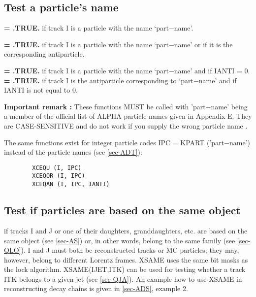 \subsection{\label{sec-TVATPN}Test a particle's name}
\par
\begin{indentlist}{ 5.75cm}{ 6.00cm}
{\bf = .TRUE.} if track I is a particle with the name
`part$-$name'.
 
{\bf = .TRUE.} if track I is a particle with the name
`part$-$name' or if it is the corresponding antiparticle.
 
{\bf = .TRUE.} if track I is a particle with the name
`part$-$name' and if IANTI = 0.
{\bf = .TRUE.} if track I is the antiparticle corresponding to
`part$-$name' and if IANTI is not equal to 0.
\end{indentlist}
 {\bf Important remark :}  These functions MUST  be called
 with 'part$-$name' being a member of the official list of ALPHA particle names given in Appendix E.
  They are CASE-SENSITIVE and do not work if you supply the wrong
 particle name .
\par
The same functions exist for
integer particle codes IPC = KPART ('part$-$name') instead of
the particle names (see \ref{sec-ADT}):
\begin{verbatim}
        XCEQU (I, IPC)
        XCEQOR (I, IPC)
        XCEQAN (I, IPC, IANTI)
\end{verbatim}
 
\subsection{\label{sec-TVATPSO}Test if particles are based on the
same object}
\par
\begin{indentlist}{ 3.25cm}{ 3.50cm}
if tracks I and J or one of their daughters,
granddaughters, etc. are based on the same object (see
\ref{sec-AS}) or, in other words, belong to the same family (see
\ref{sec-QLO}). I and J must both be reconstructed tracks or
MC particles; they may, however, belong to different
Lorentz frames. XSAME uses the same bit masks as the
lock algorithm.
XSAME(IJET,ITK)
can be used for testing whether a track ITK belongs to
a given jet (see \ref{sec-QJA}).
An example how to use XSAME in reconstructing decay chains
is given in \ref{sec-ADS}, example 2.
\end{indentlist}

